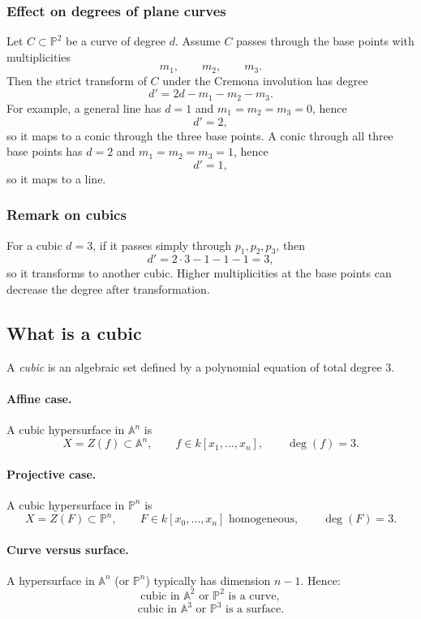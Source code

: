 \documentclass[12pt,a4paper]{article}
\theoremstyle{plain}
\theoremstyle{definition}      %
\begin{document}
\subsubsection*{Effect on degrees of plane curves}

Let $C\subset \mathbb P^2$ be a curve of degree $d$.
Assume $C$ passes through the base points with multiplicities
\[
m_1,
\qquad
m_2,
\qquad
m_3.
\]
Then the strict transform of $C$ under the Cremona involution has degree
\[
d' = 2d - m_1 - m_2 - m_3.
\]
For example, a general line has $d=1$ and $m_1=m_2=m_3=0$, hence
\[
d'=2,
\]
so it maps to a conic through the three base points.
A conic through all three base points has $d=2$ and $m_1=m_2=m_3=1$, hence
\[
d'=1,
\]
so it maps to a line.

\subsubsection*{Remark on cubics}

For a cubic $d=3$, if it passes simply through $p_1,p_2,p_3$, then
\[
d'=2\cdot 3 - 1 - 1 - 1 = 3,
\]
so it transforms to another cubic.
Higher multiplicities at the base points can decrease the degree after transformation.

\subsection*{What is a cubic}

A \emph{cubic} is an algebraic set defined by a polynomial equation of total degree $3$.

\paragraph{Affine case.}
A cubic hypersurface in $\mathbb A^n$ is
\[
X=Z(f)\subset \mathbb A^n,
\qquad
f\in k[x_1,\dots,x_n],
\qquad
\deg(f)=3.
\]

\paragraph{Projective case.}
A cubic hypersurface in $\mathbb P^n$ is
\[
X=Z(F)\subset \mathbb P^n,
\qquad
F\in k[x_0,\dots,x_n] \text{ homogeneous},
\qquad
\deg(F)=3.
\]

\paragraph{Curve versus surface.}
A hypersurface in $\mathbb A^n$ (or $\mathbb P^n$) typically has dimension $n-1$.
Hence:
\[
\text{cubic in } \mathbb A^2 \text{ or } \mathbb P^2 \text{ is a curve},
\]
\[
\text{cubic in } \mathbb A^3 \text{ or } \mathbb P^3 \text{ is a surface}.
\]
\end{document}
